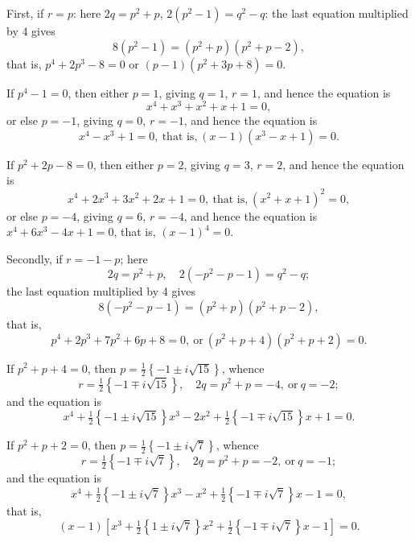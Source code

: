 \documentclass[11pt]{article}
\begin{document}
\medskip

\noindent First, if $r=p$: here $2q = p^2 + p$, $2(p^2-1) = q^2-q$: the last equation multiplied by 4 gives
\[
8(p^2-1) = (p^2+p)(p^2+p-2),
\]
that is, $p^4 + 2p^3 - 8 = 0$ or $(p-1)(p^2+3p+8) = 0$.

If $p^4-1 = 0$, then either $p=1$, giving $q=1$, $r=1$, and hence the equation is
\[
x^4 + x^3 + x^2 + x + 1 = 0,
\]
or else $p=-1$, giving $q=0$, $r=-1$, and hence the equation is
\[
x^4 - x^3 + 1 = 0,\ \text{that is,}\ (x-1)(x^3-x+1) = 0.
\]

If $p^2 + 2p - 8 = 0$, then either $p=2$, giving $q=3$, $r=2$, and hence the equation is
\[
x^4 + 2x^3 + 3x^2 + 2x + 1 = 0,\ \text{that is,}\ (x^2+x+1)^2 = 0,
\]
or else $p=-4$, giving $q=6$, $r=-4$, and hence the equation is $x^4 + 6x^3 - 4x + 1 = 0$, that is, $(x-1)^4 = 0$.

\medskip

\noindent Secondly, if $r = -1-p$; here
\[
2q = p^2 + p,\quad 2(-p^2-p-1) = q^2 - q;
\]
the last equation multiplied by 4 gives
\[
8(-p^2-p-1) = (p^2+p)(p^2+p-2),
\]
that is,
\[
p^4 + 2p^3 + 7p^2 + 6p + 8 = 0,\ \text{or}\ (p^2 + p + 4)(p^2 + p + 2) = 0.
\]

If $p^2 + p + 4 = 0$, then $p = \tfrac{1}{2}\!\left\{-1 \pm i\sqrt{15}\right\}$, whence
\[
r = \tfrac{1}{2}\!\left\{-1 \mp i\sqrt{15}\right\},\quad 2q = p^2+p = -4,\ \text{or}\ q = -2;
\]
and the equation is
\[
x^4 + \tfrac{1}{2}\!\left\{-1 \pm i\sqrt{15}\right\}\!x^3 - 2x^2 + \tfrac{1}{2}\!\left\{-1 \mp i\sqrt{15}\right\}\!x + 1 = 0.
\]

If $p^2 + p + 2 = 0$, then $p = \tfrac{1}{2}\!\left\{-1 \pm i\sqrt{7}\right\}$, whence
\[
r = \tfrac{1}{2}\!\left\{-1 \mp i\sqrt{7}\right\},\quad 2q = p^2+p = -2,\ \text{or}\ q = -1;
\]
and the equation is
\[
x^4 + \tfrac{1}{2}\!\left\{-1 \pm i\sqrt{7}\right\}\!x^3 - x^2 + \tfrac{1}{2}\!\left\{-1 \mp i\sqrt{7}\right\}\!x - 1 = 0,
\]
that is,
\[
(x-1)\!\left[x^3 + \tfrac{1}{2}\!\left\{1 \pm i\sqrt{7}\right\}\!x^2 + \tfrac{1}{2}\!\left\{-1 \mp i\sqrt{7}\right\}\!x - 1\right] = 0.
\]
\end{document}

